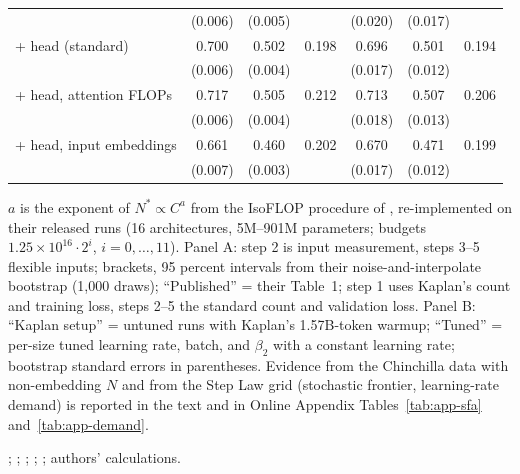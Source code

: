 \begin{table}[tp]
\begin{tabular*}{\textwidth}{@{\extracolsep{\fill}}lcccccc@{}}
 & (0.006) & (0.005) & & (0.020) & (0.017) & \\
+ head (standard) & 0.700 & 0.502 & 0.198 & 0.696 & 0.501 & 0.194 \\
 & (0.006) & (0.004) & & (0.017) & (0.012) & \\
+ head, attention FLOPs & 0.717 & 0.505 & 0.212 & 0.713 & 0.507 & 0.206 \\
 & (0.006) & (0.004) & & (0.018) & (0.013) & \\
+ head, input embeddings & 0.661 & 0.460 & 0.202 & 0.670 & 0.471 & 0.199 \\
 & (0.007) & (0.003) & & (0.017) & (0.012) & \\
\bottomrule
\end{tabular*}


\begin{tablenotes}
$a$ is the exponent of $N^*\propto C^{a}$ from the IsoFLOP procedure of \citet{porian2024resolving}, re-implemented
on their released runs (16 architectures, 5M--901M parameters; budgets $1.25\times10^{16}\cdot2^i$,
$i=0,\dots,11$). Panel A: step 2 is input measurement, steps 3--5 flexible inputs; brackets, 95 percent intervals from their noise-and-interpolate bootstrap (1,000 draws);
``Published'' = their Table~1; step 1 uses Kaplan's count and training loss, steps 2--5 the standard count and
validation loss. Panel B: ``Kaplan setup'' = untuned runs with Kaplan's 1.57B-token warmup; ``Tuned'' = per-size tuned
learning rate, batch, and $\beta_2$ with a constant learning rate; bootstrap standard errors in parentheses. Evidence from the Chinchilla data with non-embedding $N$ and from the Step Law grid (stochastic frontier,
learning-rate demand) is reported in the text and in Online Appendix Tables~\ref{tab:app-sfa} and~\ref{tab:app-demand}.
\end{tablenotes}

\begin{tablenotes}[Source]
\citet{porian2024resolving}; \citet{hoffmann2022training}; \citet{besiroglu2024chinchilla}; \citet{li2025predictablea};
\citet{bjorck2024scaling}; authors' calculations.
\end{tablenotes}
\end{table}
